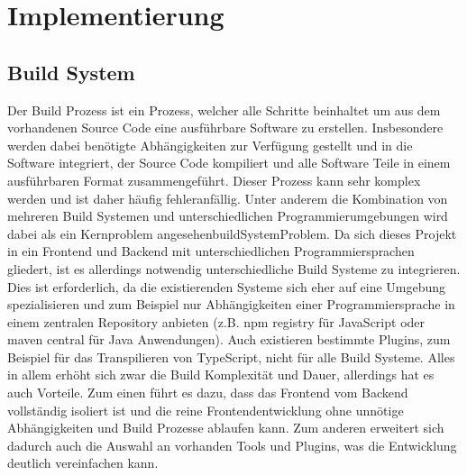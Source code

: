 \chapter{Implementierung}

\section{Build System}
Der Build Prozess ist ein Prozess, welcher alle Schritte beinhaltet um aus dem vorhandenen Source Code eine ausführbare Software zu erstellen. Insbesondere werden dabei benötigte Abhängigkeiten zur Verfügung gestellt und in die Software integriert, der Source Code kompiliert und alle Software Teile in einem ausführbaren Format zusammengeführt. Dieser Prozess kann sehr komplex werden und ist daher häufig fehleranfällig. Unter anderem die Kombination von mehreren Build Systemen und unterschiedlichen Programmierumgebungen wird dabei als ein Kernproblem angesehen\cite{buildSystemProblem}{buildSystemProblem}. Da sich dieses Projekt in ein Frontend und Backend mit unterschiedlichen Programmiersprachen gliedert, ist es allerdings notwendig unterschiedliche Build Systeme zu integrieren. Dies ist erforderlich, da die existierenden Systeme sich eher auf eine Umgebung spezialisieren und zum Beispiel nur Abhängigkeiten einer Programmiersprache in einem zentralen Repository anbieten (z.B. npm registry für JavaScript oder maven central für Java Anwendungen). Auch existieren bestimmte Plugins, zum Beispiel für das Transpilieren von TypeScript, nicht für alle Build Systeme. Alles in allem erhöht sich zwar die Build Komplexität und Dauer, allerdings hat es auch Vorteile. Zum einen führt es dazu, dass das Frontend vom Backend vollständig isoliert ist und die reine Frontendentwicklung ohne unnötige Abhängigkeiten und Build Prozesse ablaufen kann. Zum anderen erweitert sich dadurch auch die Auswahl an vorhanden Tools und Plugins, was die Entwicklung deutlich vereinfachen kann.

